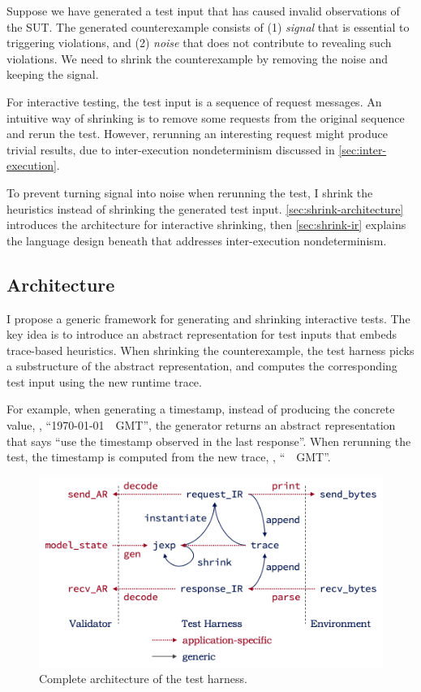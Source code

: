 Suppose we have generated a test input that has caused invalid observations of
the SUT.  The generated counterexample consists of (1) {\em signal} that is
essential to triggering violations, and (2) {\em noise} that does not contribute
to revealing such violations.  We need to shrink the counterexample by removing
the noise and keeping the signal.

For interactive testing, the test input is a sequence of request messages.  An
intuitive way of shrinking is to remove some requests from the original sequence
and rerun the test.  However, rerunning an interesting request might produce
trivial results, due to inter-execution nondeterminism discussed in
\autoref{sec:inter-execution}.

To prevent turning signal into noise when rerunning the test, I shrink the
heuristics instead of shrinking the generated test input.
\autoref{sec:shrink-architecture} introduces the architecture for interactive
shrinking, then \autoref{sec:shrink-ir} explains the language design beneath
that addresses inter-execution nondeterminism.

\subsection{Architecture}
\label{sec:shrink-architecture}

I propose a generic framework for generating and shrinking interactive tests.
The key idea is to introduce an abstract representation for test inputs that
embeds trace-based heuristics.  When shrinking the counterexample, the test
harness picks a substructure of the abstract representation, and computes the
corresponding test input using the new runtime trace.

For example, when generating a timestamp, instead of producing the concrete
value, \eg, ``\httpdate\today~\currenttime~GMT'', the generator returns an
abstract representation that says ``use the timestamp observed in the last
response''.  When rerunning the test, the timestamp is computed from the new
trace, \eg, ``\httpdate\DayAfter~\currenttime~GMT''.

\begin{figure}
  \includegraphics[width=.8\textwidth]{figures/shrink}
  \caption{Complete architecture of the test harness.}
  \label{fig:shrink}
\end{figure}

